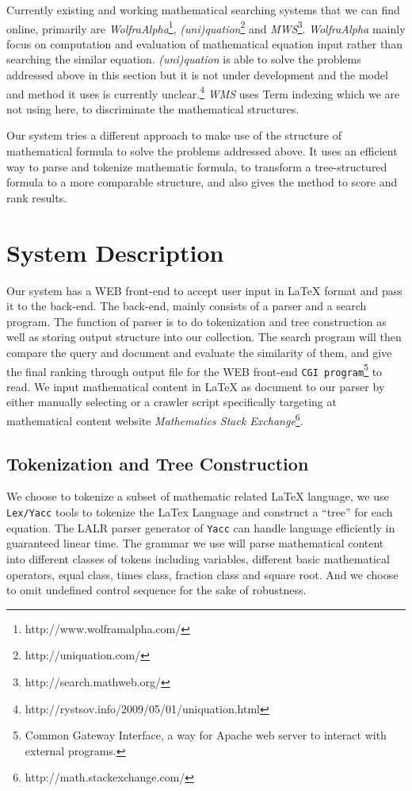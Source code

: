 \documentclass{acm_proc_article-sp}
\begin{document}
Currently existing and working mathematical searching systems that we can find online, primarily are \textit{WolfraAlpha}\footnote{http://www.wolframalpha.com/}, \textit{(uni)quation}\footnote{http://uniquation.com/} and \textit{MWS}\footnote{http://search.mathweb.org/}. \textit{WolfraAlpha} mainly focus on computation and evaluation of mathematical equation input rather than searching the similar equation. \textit{(uni)quation} is able to solve the problems addressed above in this section but it is not under development and the model and method it uses is currently unclear.\footnote{http://rystsov.info/2009/05/01/uniquation.html} \textit{WMS} uses Term indexing\cite{McCune, Stickel} which we are not using here, to discriminate the mathematical structures.

Our system tries a different approach to make use of the structure of mathematical formula to solve the problems addressed above. It uses an efficient way to parse and tokenize mathematic formula, to transform a tree-structured formula to a more comparable structure, and also gives the method to score and rank results.

\section{System Description}
Our system has a WEB front-end to accept user input in \LaTeX{} format and pass it to the back-end. The back-end, mainly consists of a parser and a search program. The function of parser is to do tokenization and tree construction as well as storing output structure into our collection. The search program will then compare the query and document and evaluate the similarity of them, and give the final ranking through output file for the WEB front-end \texttt{CGI program}\footnote{Common Gateway Interface, a way for Apache web server to interact with external programs.} to read. We input mathematical content in \LaTeX{} as document to our parser by either manually selecting or a crawler script specifically targeting at mathematical content website \textit{Mathematics Stack Exchange}\footnote{http://math.stackexchange.com/}.

\subsection{Tokenization and Tree Construction}
We choose to tokenize a subset of mathematic related \LaTeX{} language, we use \texttt{Lex/Yacc} tools to tokenize the LaTex Language and construct a ``tree'' for each equation. The LALR parser generator of \texttt{Yacc} can handle language efficiently in guaranteed linear time\cite{Knuth}. The grammar we use will parse mathematical content into different classes of tokens including variables, different basic mathematical operators, equal class, times class, fraction class and square root. And we choose to omit undefined control sequence for the sake of robustness. 
\end{document}
